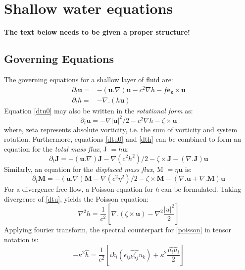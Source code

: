 \section{Shallow water equations}

\textbf{The text below needs to be given a proper structure!}

\subsection{Governing Equations}

The governing equations for a shallow layer of fluid are:
\begin{align}
  \partial_t \mathbf u 
      = &- (\mathbf{u}.\nabla) \mathbf{u} - c^2 \nabla h - f\mathbf{e_z} \times 
\mathbf u \label{dtu0} \\
  \partial_t h 
      =& - \nabla. (h \mathbf u) \label{dth}
\end{align}
Equation \eqref{dtu0} may also be written in the \textit{rotational form} as:
\begin{equation}
 \label{dtu}
 \partial_t \mathbf u 
 = - \nabla |\mathbf u|^2/2 - c^2 \nabla h - \zeta \times \mathbf u
\end{equation}
where, \gls{zeta}
represents absolute vorticity, i.e. the sum of vorticity and system rotation.
Furthermore, equations \eqref{dtu0} and \eqref{dth} can be combined to form an 
equation for the \textit{total mass flux}, \gls{J} $= h\mathbf{u}$:
\begin{equation}
  \label{dtJ}
 \partial_t \mathbf J = -(\mathbf{u}.\nabla)\mathbf{J} - \nabla(c^2h^2)/2 -
\zeta \times \mathbf J - (\nabla. \mathbf J)\mathbf u
\end{equation}
Similarly, an equation for the \textit{displaced mass flux}, \gls{M} $ = 
\eta\mathbf{u}$ is:
\begin{equation}
  \label{dtM}
 \partial_t \mathbf M = -(\mathbf{u}.\nabla)\mathbf{M} - \nabla(c^2\eta^2)/2 - 
\zeta \times \mathbf M - (\nabla.\mathbf{u} + \nabla.\mathbf{M})\mathbf u
\end{equation}
For a divergence free flow, a Poisson equation for \emph{h} can be formulated.
Taking divergence of \eqref{dtu},
yields the Poisson equation:
\begin{equation}
  \label{poisson}
  \nabla^2 h = \frac{1}{c^2} \left[ \nabla.(\zeta \times \mathbf u )
	      - \nabla^2 \frac{|u|^2}{2} \right]
\end{equation}
Applying fourier transform, the spectral counterpart for \eqref{poisson} in 
tensor notation is:
\begin{equation}
\label{poisson_fft}
  -\kappa^2 \hat{h} = \frac{1}{c^2} \left[ ik_i (\widehat{\epsilon_{ijk} \zeta_j 
u_k})
	      + \kappa^2 \frac{\widehat{u_i u_i}}{2} \right]
\end{equation}

